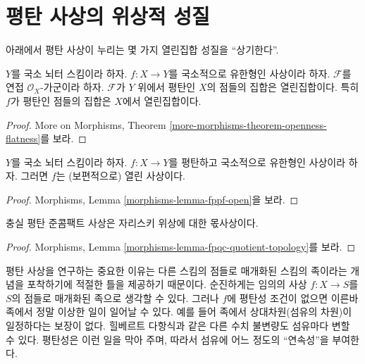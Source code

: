 \section{평탄 사상의 위상적 성질}
\label{section-topological-flat}

\noindent
아래에서 평탄 사상이 누리는 몇 가지 열린집합 성질을 “상기한다”.

\begin{theorem}
\label{theorem-flat-open}
$Y$를 국소 뇌터 스킴이라 하자.
$f : X \to Y$를 국소적으로 유한형인 사상이라 하자.
$\mathcal{F}$를 연접 $\mathcal{O}_X$-가군이라 하자.
$\mathcal{F}$가 $Y$ 위에서 평탄인 $X$의 점들의 집합은 열린집합이다.
특히 $f$가 평탄인 점들의 집합은 $X$에서 열린집합이다.
\end{theorem}

\begin{proof}
More on Morphisms, Theorem
\ref{more-morphisms-theorem-openness-flatness}를 보라.
\end{proof}

\begin{theorem}
\label{theorem-flat-map-open}
$Y$를 국소 뇌터 스킴이라 하자.
$f : X \to Y$를 평탄하고 국소적으로 유한형인 사상이라 하자.
그러면 $f$는 (보편적으로) 열린 사상이다.
\end{theorem}

\begin{proof}
Morphisms, Lemma \ref{morphisms-lemma-fppf-open}을 보라.
\end{proof}

\begin{theorem}
\label{theorem-flat-is-quotient}
충실 평탄 준콤팩트 사상은 자리스키 위상에 대한
몫사상이다.
\end{theorem}

\begin{proof}
Morphisms, Lemma \ref{morphisms-lemma-fpqc-quotient-topology}를 보라.
\end{proof}

\noindent
평탄 사상을 연구하는 중요한 이유는 다른 스킴의 점들로 매개화된
스킴의 족이라는 개념을 포착하기에 적절한 틀을 제공하기 때문이다.
순진하게는 임의의 사상 $f : X \to S$를 $S$의 점들로 매개화된
족으로 생각할 수 있다. 그러나 $f$에 평탄성 조건이 없으면
이른바 족에서 정말 이상한 일이 일어날 수 있다.
예를 들어 족에서 상대차원(섬유의 차원)이 일정하다는 보장이 없다.
힐베르트 다항식과 같은 다른 수치 불변량도 섬유마다 변할 수 있다.
평탄성은 이런 일을 막아 주며, 따라서 섬유에 어느 정도의
“연속성”을 부여한다.






